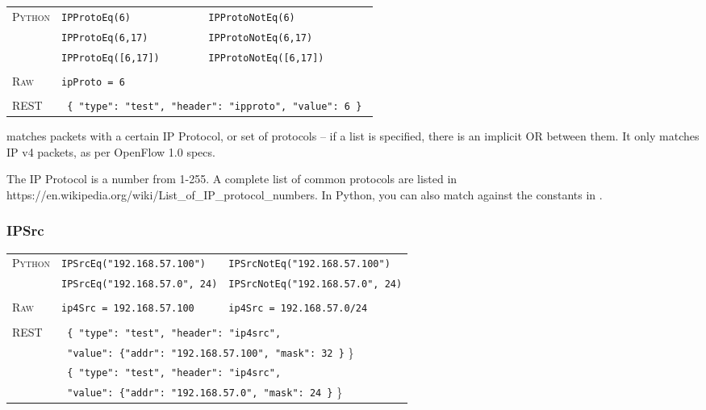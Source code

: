 \bigskip
\begin{tabularx}{\linewidth}{lXX}
\textsc{Python}   & \texttt{IPProtoEq(6)}    & \texttt{IPProtoNotEq(6)} \\
    & \texttt{IPProtoEq(6,17)}  & \texttt{IPProtoNotEq(6,17)} \\
    & \texttt{IPProtoEq([6,17])}  & \texttt{IPProtoNotEq([6,17])} \\ \\
\textsc{Raw}    & \texttt{ipProto = 6}     & \\ \\
\textsc{REST} & \multicolumn{2}{l}{\texttt{ \{ "type": "test", "header": "ipproto", "value": 6 \} }} 
\end{tabularx}

 matches packets with a certain IP Protocol, or set of protocols -- if a list is specified, 
there is an implicit OR between them.  It only matches IP v4 packets, as per OpenFlow 1.0 specs.  

The IP Protocol is a number from 1-255.  A complete list of common protocols are listed in 
https://en.wikipedia.org/wiki/List\_of\_IP\_protocol\_numbers.  In Python, you can also match against the
constants in .

\subsubsection{IPSrc}

\bigskip
\begin{tabularx}{\linewidth}{lXX}
\textsc{Python}   & \texttt{IPSrcEq("192.168.57.100")}    & \texttt{IPSrcNotEq("192.168.57.100")} \\
    & \texttt{IPSrcEq("192.168.57.0", 24)}  & \texttt{IPSrcNotEq("192.168.57.0", 24)} \\ \\
\textsc{Raw}    & \texttt{ip4Src = 192.168.57.100}     & \texttt{ip4Src = 192.168.57.0/24} \\ \\
\textsc{REST} & \multicolumn{2}{l}{\texttt{ \{ "type": "test", "header": "ip4src",}} \\
   & \multicolumn{2}{l}{\texttt{  "value": \{"addr": "192.168.57.100", "mask": 32 \}} \}} \\
   & \multicolumn{2}{l}{\texttt{ \{ "type": "test", "header": "ip4src",}} \\
   & \multicolumn{2}{l}{\texttt{  "value": \{"addr": "192.168.57.0", "mask": 24 \}} \}} \\
\end{tabularx}

